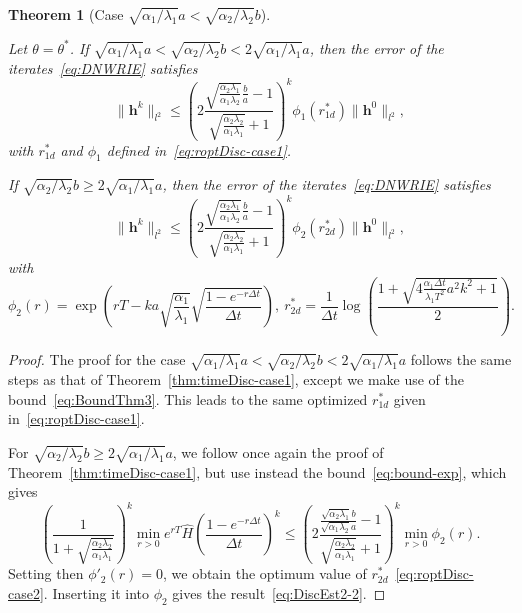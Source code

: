 \documentclass[reqno]{amsart}
\newtheorem{theorem}{Theorem}
\begin{document}
\begin{theorem}[Case $\sqrt{\alpha_1/\lambda_1} a < \sqrt{\alpha_2/\lambda_2} b$]\label{thm:timeDisc-case2}

Let $\theta = \theta^*$. If $\sqrt{\alpha_1/\lambda_1} a < \sqrt{\alpha_2/\lambda_2} b < 2\sqrt{\alpha_1/\lambda_1} a$, then the error of the iterates~\eqref{eq:DNWRIE} satisfies
\begin{equation}\label{eq:DiscEst2-1}
\|\boldsymbol{h}^k\|_{l^2} \leq \left(2\frac{\sqrt{\frac{\alpha_2 \lambda_1}{\alpha_1\lambda_2}}\frac{b}{a} -1}{\sqrt{\frac{\alpha_2 \lambda_2}{\alpha_1\lambda_1}} + 1} \right)^k \phi_1(r^*_{1d}) \|\boldsymbol{h}^0\|_{l^2},
\end{equation}
with $r^*_{1d}$ and $\phi_1$ defined in~\eqref{eq:roptDisc-case1}. 

If $\sqrt{\alpha_2/\lambda_2} b \geq 2\sqrt{\alpha_1/\lambda_1} a$, then the error of the iterates~\eqref{eq:DNWRIE} satisfies
\begin{equation}\label{eq:DiscEst2-2}
\|\boldsymbol{h}^k\|_{l^2} \leq \left(2\frac{\sqrt{\frac{\alpha_2 \lambda_1}{\alpha_1\lambda_2}}\frac{b}{a} - 1}{\sqrt{\frac{\alpha_2 \lambda_2}{\alpha_1\lambda_1}}+1} \right)^k 
\phi_2(r_{2d}^*) \|\boldsymbol{h}^0\|_{l^2},
\end{equation}
with 
\begin{equation}\label{eq:roptDisc-case2}
\phi_2(r) = \exp\left( r T  - ka\sqrt{\frac{\alpha_1}{\lambda_1}}\sqrt{\frac{1-e^{-r \Delta t}}{\Delta t}}\right), \  r^*_{2d} = \frac1{\Delta t}\log\left(\frac{1 + \sqrt{4\frac{\alpha_1  \Delta t}{ \lambda_1 T^2}a^2 k^2 + 1}}{2}\right).
\end{equation}
\end{theorem}


\begin{proof}
The proof for the case $\sqrt{\alpha_1/\lambda_1} a < \sqrt{\alpha_2/\lambda_2} b < 2\sqrt{\alpha_1/\lambda_1} a$ follows the same steps as that of Theorem~\ref{thm:timeDisc-case1}, except we make use of the bound~\eqref{eq:BoundThm3}. This leads to the same optimized $r^*_{1d}$ given in~\eqref{eq:roptDisc-case1}.
	

For $\sqrt{\alpha_2/\lambda_2} b \geq 2\sqrt{\alpha_1/\lambda_1} a$, we follow once again the proof of Theorem~\ref{thm:timeDisc-case1}, but use instead  the bound~\eqref{eq:bound-exp}, which gives
\[\left(\frac1{1+\sqrt{\frac{\alpha_2\lambda_2}{\alpha_1\lambda_1}}}\right)^k\min_{r>0}e^{rT} \hat H \left(\frac{1-e^{-r \Delta t}}{\Delta t}\right)^k 
\leq \left(2\frac{\frac{\sqrt{\alpha_2 \lambda_1}b}{\sqrt{\alpha_1\lambda_2}a} - 1}{\sqrt{\frac{\alpha_2 \lambda_2}{\alpha_1\lambda_1}}+1} \right)^k \min_{r > 0} \phi_2(r).\]
Setting then $\phi'_2(r)=0$, we obtain the optimum value of $r^*_{2d}$~\eqref{eq:roptDisc-case2}. Inserting it into $\phi_2$ gives the result~\eqref{eq:DiscEst2-2}.
\end{proof}
\end{document}
